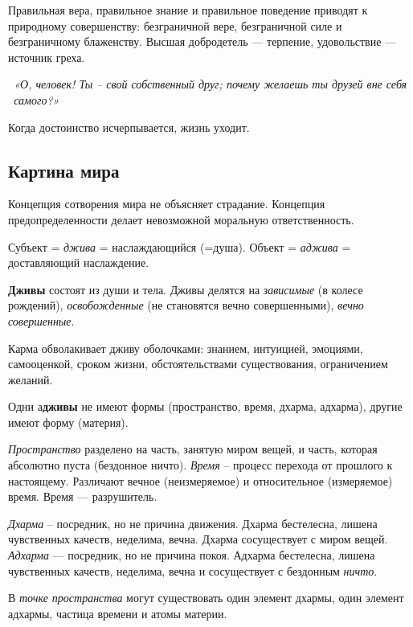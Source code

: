 \documentclass[a4paper]{article}
\begin{document}
{
Правильная вера, правильное знание и правильное поведение приводят к природному совершенству: безграничной вере,
безграничной силе и безграничному блаженству. Высшая добродетель — терпение, удовольствие — источник греха. }

{\itshape
\ «О, человек! Ты – свой собственный друг; почему желаешь ты друзей вне себя \ самого?»}

{
Когда достоинство исчерпывается, жизнь уходит.}

\subsection[Картина мира]{ Картина мира}
{
Концепция сотворения мира не объясняет страдание. Концепция предопределенности делает невозможной моральную
ответственность.}

{
Субъект = \textit{джива} = наслаждающийся (=душа). Объект = \textit{аджива} = доставляющий наслаждение. }

{
\textbf{Дживы} состоят из души и тела. Дживы делятся на \textit{зависимые} (в колесе рождений), \textit{освобожденные}
(не становятся вечно совершенными), \textit{вечно совершенные}.}

{
Карма обволакивает дживу оболочками: знанием, интуицией, эмоциями, самооценкой, сроком жизни, обстоятельствами
существования, ограничением желаний.}

{
Одни а\textbf{дживы }не имеют формы (пространство, время, дхарма, адхарма), другие имеют форму (материя). }

{
\textit{Пространство} разделено на часть, занятую миром вещей, и часть, которая абсолютно пуста (бездонное ничто).
\textit{Время} – процесс перехода от прошлого к настоящему. Различают вечное (неизмеряемое) и относительное
(измеряемое) время. Время — разрушитель.}

{
\textit{Дхарма} – посредник, но не причина движения. Дхарма бестелесна, лишена чувственных качеств, неделима, вечна.
Дхарма сосуществует с миром вещей. \textit{Адхарма} — посредник, но не причина покоя. Адхарма бестелесна, лишена
чувственных качеств, неделима, вечна и сосуществует с бездонным \textit{ничто}.}

{
В \textit{точке пространства} могут существовать один элемент дхармы, один элемент адхармы, частица времени и атомы
материи.}
\end{document}
